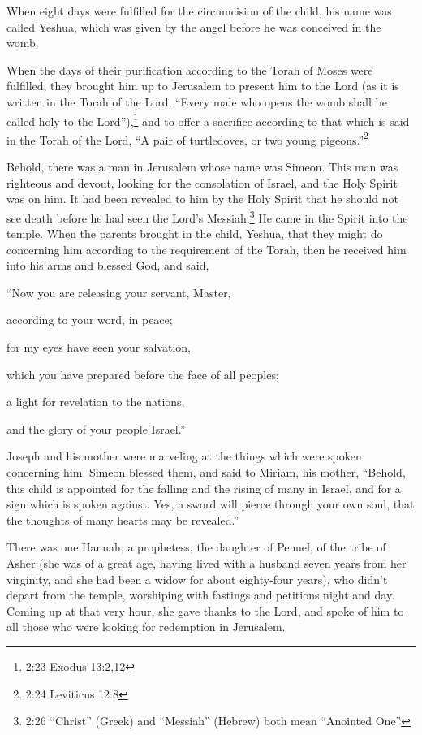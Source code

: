 \myverse{}When eight days were fulfilled for the circumcision of the child,
his name was called Yeshua, which was given by the angel before he was conceived in the womb.

\myverse{}When the days of their purification according to the Torah of Moses
were fulfilled, they brought him up to Jerusalem to present him to the Lord
\myverse{}(as it is written in the Torah of the Lord, “Every male who opens the womb
shall be called holy to the Lord”),\footnote{ 2:23 Exodus 13:2,12}
\myverse{}and to offer a sacrifice according to that which is said in the Torah of the Lord,
“A pair of turtledoves, or two young pigeons.”\footnote{ 2:24 Leviticus 12:8}

\myverse{}Behold, there was a man in Jerusalem whose name was Simeon. This
man was righteous and devout, looking for the consolation of Israel, and the Holy Spirit was on him.
\myverse{}It had been revealed to him by the Holy Spirit that he should not see death
before he had seen the Lord’s Messiah.\footnote{2:26 “Christ” (Greek) and “Messiah” (Hebrew) both mean “Anointed One”}
\myverse{}He came in the Spirit into the temple. When the parents brought in the child,
Yeshua, that they might do concerning him according to the requirement of the Torah,
\myverse{}then he received him into his arms and blessed God, and said,

\myverse{}“Now you are releasing your servant, Master,

according to your word, in peace;

\myverse{}for my eyes have seen your salvation,

\myverse{}which you have prepared before the face of all peoples;

\myverse{}a light for revelation to the nations,

and the glory of your people Israel.”

\myverse{}Joseph and his mother were marveling at the things which were
spoken concerning him.
\myverse{}Simeon blessed them, and said to Miriam, his mother, “Behold, this child is
appointed for the falling and the rising of many in Israel, and for a sign which is spoken against.
\myverse{}Yes, a sword will pierce through your own soul, that the thoughts of many
hearts may be revealed.”

\myverse{}There was one Hannah, a prophetess, the daughter of Penuel, of
the tribe of Asher (she was of a great age, having lived with a husband seven years from her virginity,
\myverse{}and she had been a widow for about eighty-four years), who didn’t depart from
the temple, worshiping with fastings and petitions night and day.
\myverse{}Coming up at that very hour, she gave thanks to the Lord, and spoke of him
to all those who were looking for redemption in Jerusalem.


